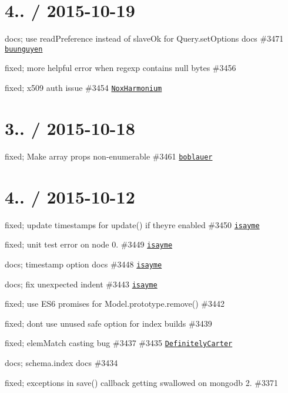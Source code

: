 \section*{4.. / 2015-\/10-\/19 }


\begin{DoxyItemize}
\item docs; use read\+Preference instead of slave\+Ok for Query.\+set\+Options docs \#3471 \href{https://github.com/buunguyen}{\tt buunguyen}
\item fixed; more helpful error when regexp contains null bytes \#3456
\item fixed; x509 auth issue \#3454 \href{https://github.com/NoxHarmonium}{\tt Nox\+Harmonium}
\end{DoxyItemize}

\section*{3.. / 2015-\/10-\/18 }


\begin{DoxyItemize}
\item fixed; Make array props non-\/enumerable \#3461 \href{https://github.com/boblauer}{\tt boblauer}
\end{DoxyItemize}

\section*{4.. / 2015-\/10-\/12 }


\begin{DoxyItemize}
\item fixed; update timestamps for update() if they\textquotesingle{}re enabled \#3450 \href{https://github.com/isayme}{\tt isayme}
\item fixed; unit test error on node 0. \#3449 \href{https://github.com/isayme}{\tt isayme}
\item docs; timestamp option docs \#3448 \href{https://github.com/isayme}{\tt isayme}
\item docs; fix unexpected indent \#3443 \href{https://github.com/isayme}{\tt isayme}
\item fixed; use E\+S6 promises for Model.\+prototype.\+remove() \#3442
\item fixed; don\textquotesingle{}t use unused \textquotesingle{}safe\textquotesingle{} option for index builds \#3439
\item fixed; elem\+Match casting bug \#3437 \#3435 \href{https://github.com/DefinitelyCarter}{\tt Definitely\+Carter}
\item docs; schema.\+index docs \#3434
\item fixed; exceptions in save() callback getting swallowed on mongodb 2. \#3371
\end{DoxyItemize}

